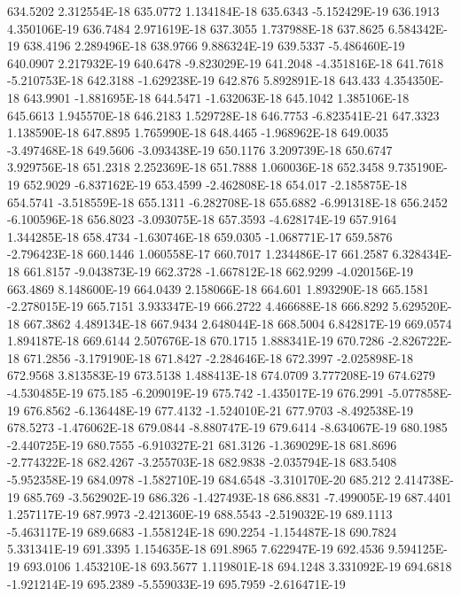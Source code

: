 634.5202  2.312554E-18
635.0772  1.134184E-18
635.6343  -5.152429E-19
636.1913  4.350106E-19
636.7484  2.971619E-18
637.3055  1.737988E-18
637.8625  6.584342E-19
638.4196  2.289496E-18
638.9766  9.886324E-19
639.5337  -5.486460E-19
640.0907  2.217932E-19
640.6478  -9.823029E-19
641.2048  -4.351816E-18
641.7618  -5.210753E-18
642.3188  -1.629238E-19
642.876  5.892891E-18
643.433  4.354350E-18
643.9901  -1.881695E-18
644.5471  -1.632063E-18
645.1042  1.385106E-18
645.6613  1.945570E-18
646.2183  1.529728E-18
646.7753  -6.823541E-21
647.3323  1.138590E-18
647.8895  1.765990E-18
648.4465  -1.968962E-18
649.0035  -3.497468E-18
649.5606  -3.093438E-19
650.1176  3.209739E-18
650.6747  3.929756E-18
651.2318  2.252369E-18
651.7888  1.060036E-18
652.3458  9.735190E-19
652.9029  -6.837162E-19
653.4599  -2.462808E-18
654.017  -2.185875E-18
654.5741  -3.518559E-18
655.1311  -6.282708E-18
655.6882  -6.991318E-18
656.2452  -6.100596E-18
656.8023  -3.093075E-18
657.3593  -4.628174E-19
657.9164  1.344285E-18
658.4734  -1.630746E-18
659.0305  -1.068771E-17
659.5876  -2.796423E-18
660.1446  1.060558E-17
660.7017  1.234486E-17
661.2587  6.328434E-18
661.8157  -9.043873E-19
662.3728  -1.667812E-18
662.9299  -4.020156E-19
663.4869  8.148600E-19
664.0439  2.158066E-18
664.601  1.893290E-18
665.1581  -2.278015E-19
665.7151  3.933347E-19
666.2722  4.466688E-18
666.8292  5.629520E-18
667.3862  4.489134E-18
667.9434  2.648044E-18
668.5004  6.842817E-19
669.0574  1.894187E-18
669.6144  2.507676E-18
670.1715  1.888341E-19
670.7286  -2.826722E-18
671.2856  -3.179190E-18
671.8427  -2.284646E-18
672.3997  -2.025898E-18
672.9568  3.813583E-19
673.5138  1.488413E-18
674.0709  3.777208E-19
674.6279  -4.530485E-19
675.185  -6.209019E-19
675.742  -1.435017E-19
676.2991  -5.077858E-19
676.8562  -6.136448E-19
677.4132  -1.524010E-21
677.9703  -8.492538E-19
678.5273  -1.476062E-18
679.0844  -8.880747E-19
679.6414  -8.634067E-19
680.1985  -2.440725E-19
680.7555  -6.910327E-21
681.3126  -1.369029E-18
681.8696  -2.774322E-18
682.4267  -3.255703E-18
682.9838  -2.035794E-18
683.5408  -5.952358E-19
684.0978  -1.582710E-19
684.6548  -3.310170E-20
685.212  2.414738E-19
685.769  -3.562902E-19
686.326  -1.427493E-18
686.8831  -7.499005E-19
687.4401  1.257117E-19
687.9973  -2.421360E-19
688.5543  -2.519032E-19
689.1113  -5.463117E-19
689.6683  -1.558124E-18
690.2254  -1.154487E-18
690.7824  5.331341E-19
691.3395  1.154635E-18
691.8965  7.622947E-19
692.4536  9.594125E-19
693.0106  1.453210E-18
693.5677  1.119801E-18
694.1248  3.331092E-19
694.6818  -1.921214E-19
695.2389  -5.559033E-19
695.7959  -2.616471E-19
